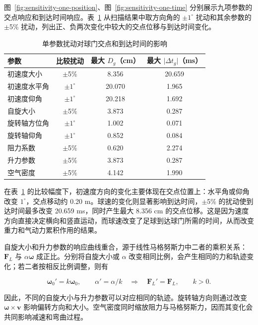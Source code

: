 \documentclass[12pt,letterpaper]{article}
\begin{document}
图~\ref{fig:sensitivity-one-position}、图~\ref{fig:sensitivity-one-time} 分别展示九项参数的交点响应和到达时间响应。表~\ref{tab:sensitivity-one-factor} 从扫描结果中取方向角的 $\pm$$1^\circ$ 扰动和其余参数的 $\pm$5\% 扰动，列出正、负两次变化中较大的交点位移与到达时间变化。


\begin{table}[H]
\centering
\small
\renewcommand{\arraystretch}{1.16}
\caption{单参数扰动对球门交点和到达时间的影响}
\begin{tabular}{lccc}
\toprule
参数 & 比较扰动 & 最大 $D_g$（cm） & 最大 $\lvert\Delta t_g\rvert$（ms）\\
\midrule
初速度大小 & $\pm$5\% & 8.356 & 20.659\\
初速度水平角 & $\pm$$1^\circ$ & 20.070 & 1.965\\
初速度仰角 & $\pm$$1^\circ$ & 20.218 & 1.692\\
自旋大小 & $\pm$5\% & 3.873 & 0.287\\
旋转轴方位角 & $\pm$$1^\circ$ & 1.002 & 0.071\\
旋转轴仰角 & $\pm$$1^\circ$ & 0.852 & 0.084\\
阻力系数 & $\pm$5\% & 0.620 & 2.274\\
升力参数 & $\pm$5\% & 3.873 & 0.287\\
空气密度 & $\pm$5\% & 4.142 & 1.990\\
\bottomrule
\end{tabular}
\label{tab:sensitivity-one-factor}
\end{table}

在表~\ref{tab:sensitivity-one-factor} 的比较幅度下，初速度方向的变化主要体现在交点位置上：水平角或仰角改变 $1^\circ$，交点移动约 0.20 m。球速的变化则显著影响到达时间，$\pm$5\% 的扰动使到达时间最多改变 20.659 ms，同时产生最大 8.356 cm 的交点位移。这是因为速度方向直接决定横向和竖直运动，而球速改变了足球到达球门所需的时间，从而改变重力和气动力累积作用的结果。


自旋大小和升力参数的响应曲线重合，源于线性马格努斯力中二者的乘积关系：$\boldsymbol F_L$ 与 $\alpha\boldsymbol\omega$ 成正比。分别将自旋大小或 $\alpha$ 改变相同比例，会产生相同的力和轨迹变化；若二者按相反比例调整，则有


\begin{equation}
\boldsymbol\omega_0'=k\boldsymbol\omega_0,\qquad
\alpha'=\alpha/k
\quad\Longrightarrow\quad
\boldsymbol F_L'=\boldsymbol F_L,\qquad k>0.
\label{eq:sensitivity-spin-compensation}
\end{equation}

因此，不同的自旋大小与升力参数可以对应相同的轨迹。旋转轴方向则通过改变 $\boldsymbol\omega\times\boldsymbol v$ 影响偏转方向和大小。空气密度同时缩放阻力与马格努斯力，因而其变化会共同影响减速和弯曲过程。
\end{document}
